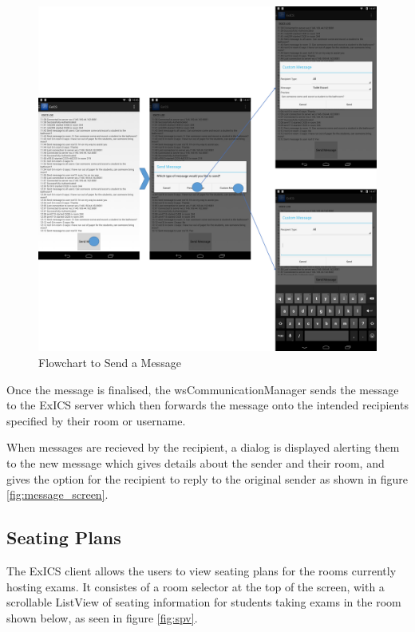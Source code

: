 \begin{figure}[!htpb]
	\centering
	\includegraphics[width=\textwidth]{"screenshots/send_message_flowchart"}
	\caption{Flowchart to Send a Message}
	\label{fig:send_message_flowchart}
\end{figure}

\FloatBarrier

Once the message is finalised, the wsCommunicationManager sends the message to the ExICS server which then forwards the message onto the intended recipients specified by their room or username.

When messages are recieved by the recipient, a dialog is displayed alerting them to the new message which gives details about the sender and their room, and gives the option for the recipient to reply to the original sender as shown in figure \ref{fig:message_screen}.

\subsection{Seating Plans}

The ExICS client allows the users to view seating plans for the rooms currently hosting exams.  It consistes of a room selector at the top of the screen, with a scrollable ListView of seating information for students taking exams in the room shown below, as seen in figure \ref{fig:spv}.

